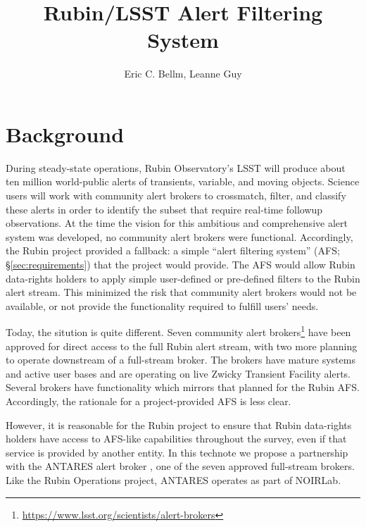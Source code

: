 \documentclass[DM,authoryear,toc]{lsstdoc}
\title{Rubin/LSST Alert Filtering System}
\author{%
Eric C. Bellm, Leanne Guy
}
\date{\vcsDate}
\begin{document}
\maketitle


\section{Background}

During steady-state operations, Rubin Observatory's LSST will produce about ten million world-public alerts of transients, variable, and moving objects.
Science users will work with community alert brokers to crossmatch, filter, and classify these alerts in order to identify the subset that require real-time followup observations.
At the time the vision for this ambitious and comprehensive alert system was developed, no community alert brokers were functional.
Accordingly, the Rubin project provided a fallback: a simple ``alert filtering system'' (AFS; \S \ref{sec:requirements}) that the project would provide.
The AFS would allow Rubin data-rights holders to apply simple user-defined or pre-defined filters to the Rubin alert stream.
This minimized the risk that community alert brokers would not be available, or not provide the functionality required to fulfill users' needs.

Today, the sitution is quite different.
Seven community alert brokers\footnote{\url{https://www.lsst.org/scientists/alert-brokers}} have been approved for direct access to the full Rubin alert stream, with two more planning to operate downstream of a full-stream broker.
The brokers have mature systems and active user bases and are operating on live Zwicky Transient Facility alerts.
Several brokers have functionality which mirrors that planned for the Rubin AFS.
Accordingly, the rationale for a project-provided AFS is less clear.

However, it is reasonable for the Rubin project to ensure that Rubin data-rights holders have access to AFS-like capabilities throughout the survey, even if that service is provided by another entity.
In this technote we propose a partnership with the ANTARES alert broker \citep{2021AJ....161..107M}, one of the seven approved full-stream brokers. 
Like the Rubin Operations project, ANTARES operates as part of NOIRLab.
\end{document}
